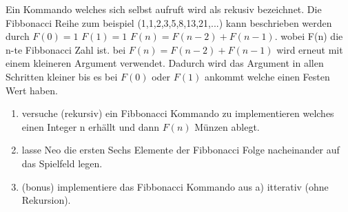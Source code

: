 \begin{Infobox}[Rekursion]
Ein Kommando welches sich selbst aufruft wird als rekusiv bezeichnet. Die Fibbonacci Reihe zum beispiel (1,1,2,3,5,8,13,21,...) kann beschrieben werden durch $F(0)=1$ $F(1)=1$ $F(n)=F(n-2)+F(n-1)$. wobei F(n) die n-te Fibbonacci Zahl ist. bei $F(n)=F(n-2)+F(n-1)$ wird erneut mit einem kleineren Argument verwendet. Dadurch wird das Argument in allen Schritten kleiner bis es bei $F(0)$ oder $F(1)$ ankommt welche einen Festen Wert haben.
\end{Infobox}
\begin{enumerate}
\item versuche (rekursiv) ein Fibbonacci Kommando zu implementieren welches einen Integer n erhällt und dann $F(n)$ Münzen ablegt.
\item lasse Neo die ersten Sechs Elemente der Fibbonacci Folge nacheinander auf das Spielfeld legen.
\item (bonus) implementiere das Fibbonacci Kommando aus a) itterativ (ohne Rekursion).  
\end{enumerate}
